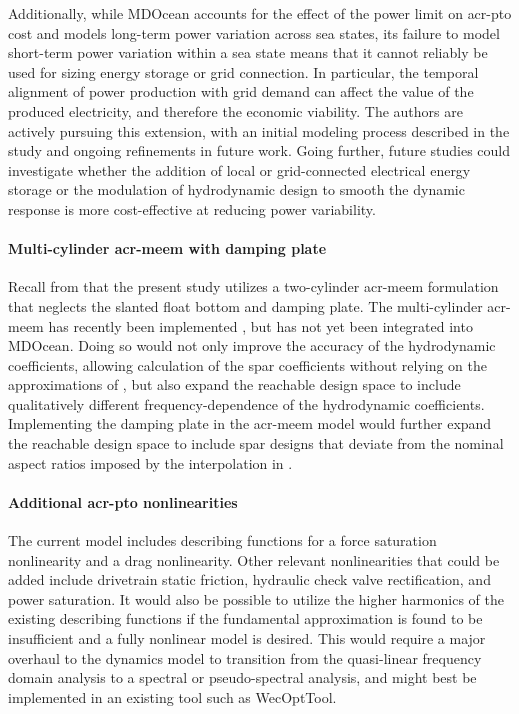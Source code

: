     Additionally, while MDOcean accounts for the effect of the power limit on \gls{acr-pto} cost and models long-term power variation across sea states, its failure to model short-term power variation within a sea state means that it cannot reliably be used for sizing energy storage or grid connection.
    In particular, the temporal alignment of power production with grid demand can affect the value of the produced electricity, and therefore the economic viability.
    The authors are actively pursuing this extension, with an initial modeling process described in the study \citep{mccabe_wec_2025} and ongoing refinements in future work.
    Going further, future studies could investigate whether the addition of local or grid-connected electrical energy storage or the modulation of hydrodynamic design to smooth the dynamic response is more cost-effective at reducing power variability.
    
    \paragraph{Multi-cylinder \gls{acr-meem} with damping plate}
    Recall from  that the present study utilizes a two-cylinder \gls{acr-meem} formulation that neglects the slanted float bottom and damping plate.
    The multi-cylinder \gls{acr-meem} has recently been implemented \citep{best_openflash_2026,bimali_matrix_2026}, but has not yet been integrated into MDOcean.
    Doing so would not only improve the accuracy of the hydrodynamic coefficients, allowing calculation of the spar coefficients without relying on the approximations of , but also expand the reachable design space to include qualitatively different frequency-dependence of the hydrodynamic coefficients.
    Implementing the damping plate in the \gls{acr-meem} model would further expand the reachable design space to include spar designs that deviate from the nominal aspect ratios imposed by the interpolation in .
    
    \paragraph{Additional \gls{acr-pto} nonlinearities}
    The current model includes describing functions for a force saturation nonlinearity and a drag nonlinearity.
    Other relevant nonlinearities that could be added include drivetrain static friction, hydraulic check valve rectification, and power saturation.
    It would also be possible to utilize the higher harmonics of the existing describing functions if the fundamental approximation is found to be insufficient and a fully nonlinear model is desired.
    This would require a major overhaul to the dynamics model to transition from the quasi-linear frequency domain analysis to a spectral or pseudo-spectral analysis, and might best be implemented in an existing tool such as WecOptTool.
    
